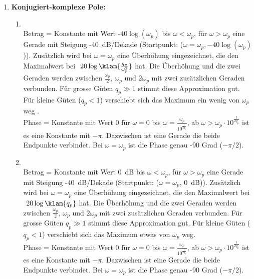 {\begin{enumerate}
      \item{} {\bf Konjugiert-komplexe Pole:} 
\begin{enumerate}\item{} \\
        Betrag = Konstante mit Wert -$40\log(\omega_p)$ bis
        $\omega<\omega_p$, f\"ur $\omega>\omega_p$ eine Gerade mit
        Steigung -40~dB/Dekade (Startpunkt:
        ($\omega=\omega_p,-40\log(\omega_p)$)). Zus\"atzlich wird bei
        $\omega=\omega_p$ eine \"Uberh\"ohung eingezeichnet, die den Maximalwert bei $~20\log\klam{\frac{q_p}{\omega_p^2}}$ hat. Die \"Uberh\"ohung und die zwei Geraden werden zwischen $\frac{\omega_p}{2}$, $\omega_p$ und $2\omega_p$ mit zwei zus\"atzlichen Geraden verbunden. F\"ur grosse G\"uten $q_p\gg 1$ stimmt diese Approximation gut. F\"ur kleine G\"uten ($q_p<1$) verschiebt sich das Maximum ein wenig von $\omega_p$ weg \cite{FRE:BOS:04, UNB:81}.\\
        Phase = Konstante mit Wert 0 f\"ur $\omega=0$ bis
        $\omega=\frac{\omega_p}{10^{\frac{1}{2q_p}}}$, ab
        $\omega>\omega_p\cdot 10^{\frac{1}{2q_p}}$ ist es eine
        Konstante mit $-\pi$. Dazwischen ist eine Gerade die beide
        Endpunkte verbindet. Bei $\omega=\omega_p$ ist die Phase genau
        -90 Grad ($-\pi/2$).
\item{} \\
   Betrag = Konstante mit Wert 0~dB bis
        $\omega<\omega_p$, f\"ur $\omega>\omega_p$ eine Gerade mit
        Steigung -40~dB/Dekade (Startpunkt:
        ($\omega=\omega_p$, 0~dB)). Zus\"atzlich wird bei
        $\omega=\omega_p$ eine \"Uberh\"ohung eingezeichnet, die den Maximalwert bei $~20\log\klam{q_p}$ hat. Die \"Uberh\"ohung und die zwei Geraden werden zwischen $\frac{\omega_p}{2}$, $\omega_p$ und $2\omega_p$ mit zwei zus\"atzlichen Geraden verbunden. F\"ur grosse G\"uten $q_p\gg 1$ stimmt diese Approximation gut. F\"ur kleine G\"uten ($q_p<1$) verschiebt sich das Maximum etwas von $\omega_p$ weg.\\
        Phase = Konstante mit Wert 0 f\"ur $\omega=0$ bis
        $\omega=\frac{\omega_p}{10^{\frac{1}{2q_p}}}$, ab
        $\omega>\omega_p\cdot 10^{\frac{1}{2q_p}}$ ist es eine
        Konstante mit $-\pi$. Dazwischen ist eine Gerade die beide
        Endpunkte verbindet. Bei $\omega=\omega_p$ ist die Phase genau
        -90 Grad ($-\pi/2$).
        \end{enumerate}

\end{enumerate}}
